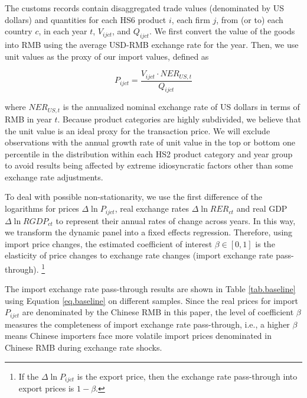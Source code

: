 \documentclass[12pt]{article}
\begin{document}
The customs records contain disaggregated trade values (denominated by US dollars) and quantities for each HS6 product $i$, each firm $j$, from (or to) each country $c$, in each year $t$, $V_{ijct}$, and $Q_{ijct}$. We first convert the value of the goods into RMB using the average USD-RMB exchange rate for the year. Then, we use unit values as the proxy of our import values, defined as 

$$
P_{ijct}=\frac{V_{ijct}\cdot NER_{US,t}}{Q_{ijct}}
$$

where $NER_{US,t}$ is the annualized nominal exchange rate of US dollars in terms of RMB in year $t$. Because product categories are highly subdivided, we believe that the unit value is an ideal proxy for the transaction price. We will exclude observations with the annual growth rate of unit value in the top or bottom one percentile in the distribution within each HS2 product category and year group to avoid results being affected by extreme idiosyncratic factors other than some exchange rate adjustments.

To deal with possible non-stationarity, we use the first difference of the logarithms for prices $\Delta \ln P_{i j c t}$, real exchange rates $\Delta \ln R E R_{c t}$ and real GDP $\Delta \ln R G D P_{c t}$ to represent their annual rates of change across years. In this way, we transform the dynamic panel into a fixed effects regression. Therefore, using import price changes, the estimated coefficient of interest $\beta \in [0,1]$ is the elasticity of price changes to exchange rate changes (import exchange rate pass-through). \footnote{If the $\Delta \ln P_{i j c t}$ is the export price, then the exchange rate pass-through into export prices is $1-\beta$.}

The import exchange rate pass-through results are shown in Table \ref{tab.baseline} using Equation \ref{eq.baseline} on different samples. Since the real prices for import $P_{i j c t}$ are denominated by the Chinese RMB in this paper, the level of coefficient $\beta$ measures the completeness of import exchange rate pass-through, i.e., a higher $\beta$ means Chinese importers face more volatile import prices denominated in Chinese RMB during exchange rate shocks. 
\end{document}
